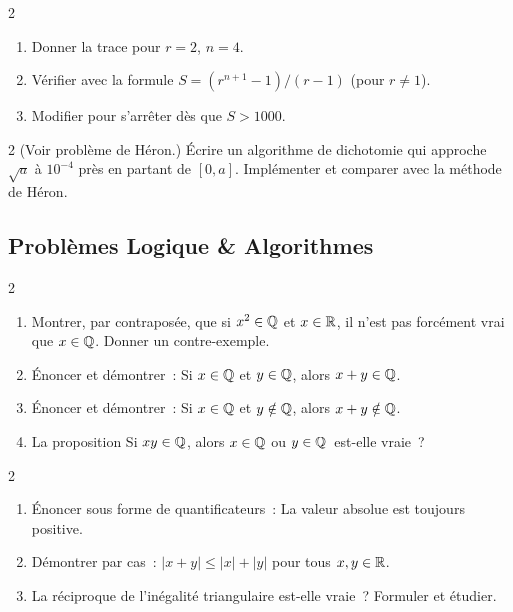 \begin{bilan}
\begin{exo}{2}
\begin{enumerate}
  \item Donner la trace pour $r=2$, $n=4$.
  \item V\'erifier avec la formule $S = (r^{n+1}-1)/(r-1)$ (pour $r\ne1$).
  \item Modifier pour s'arr\^eter d\`es que $S>1000$.
\end{enumerate}
\end{exo}

\begin{exo}{2}
(Voir probl\`eme de H\'eron.) \'Ecrire un algorithme de dichotomie
qui approche $\sqrt{a}$ \`a $10^{-4}$ pr\`es en partant de $[0, a]$.
Impl\'ementer et comparer avec la m\'ethode de H\'eron.
\end{exo}

\subsection*{Probl\`emes Logique \& Algorithmes}

\begin{probleme}{2}
\begin{enumerate}
  \item Montrer, par contrapos\'ee, que si $x^2\in\mathbb{Q}$ et $x\in\mathbb{R}$,
        il n'est pas forc\'ement vrai que $x\in\mathbb{Q}$.
        Donner un contre-exemple.
  \item \'Enoncer et d\'emontrer~:
        \og Si $x\in\mathbb{Q}$ et $y\in\mathbb{Q}$, alors $x+y\in\mathbb{Q}$.\fg
  \item \'Enoncer et d\'emontrer~:
        \og Si $x\in\mathbb{Q}$ et $y\notin\mathbb{Q}$, alors $x+y\notin\mathbb{Q}$.\fg
  \item La proposition \og Si $xy\in\mathbb{Q}$, alors $x\in\mathbb{Q}$ ou $y\in\mathbb{Q}$\fg\ est-elle vraie~?
\end{enumerate}
\end{probleme}

\begin{probleme}{2}
\begin{enumerate}
  \item \'Enoncer sous forme de quantificateurs~:
        \og La valeur absolue est toujours positive.\fg
  \item D\'emontrer par cas~: $|x+y|\leq|x|+|y|$ pour tous $x,y\in\mathbb{R}$.
  \item La r\'eciproque de l'in\'egalit\'e triangulaire est-elle vraie~?
        Formuler et \'etudier.
\end{enumerate}
\end{probleme}


\end{bilan}
